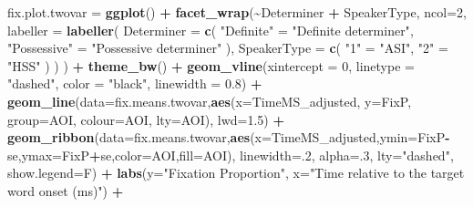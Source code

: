 \documentclass[
]{article}
\newenvironment{Shaded}{\begin{snugshade}}{\end{snugshade}}
\newcommand{\AttributeTok}[1]{\textcolor[rgb]{0.13,0.29,0.53}{#1}}
\newcommand{\DecValTok}[1]{\textcolor[rgb]{0.00,0.00,0.81}{#1}}
\newcommand{\FloatTok}[1]{\textcolor[rgb]{0.00,0.00,0.81}{#1}}
\newcommand{\FunctionTok}[1]{\textcolor[rgb]{0.13,0.29,0.53}{\textbf{#1}}}
\newcommand{\NormalTok}[1]{#1}
\newcommand{\OtherTok}[1]{\textcolor[rgb]{0.56,0.35,0.01}{#1}}
\newcommand{\SpecialCharTok}[1]{\textcolor[rgb]{0.81,0.36,0.00}{\textbf{#1}}}
\newcommand{\StringTok}[1]{\textcolor[rgb]{0.31,0.60,0.02}{#1}}
\begin{document}
\begin{Shaded}
\begin{Highlighting}[]
\NormalTok{fix.plot.twovar }\OtherTok{=} \FunctionTok{ggplot}\NormalTok{() }\SpecialCharTok{+} 
  \FunctionTok{facet\_wrap}\NormalTok{(}\SpecialCharTok{\textasciitilde{}}\NormalTok{Determiner }\SpecialCharTok{+}\NormalTok{ SpeakerType, }\AttributeTok{ncol=}\DecValTok{2}\NormalTok{,}
             \AttributeTok{labeller =} \FunctionTok{labeller}\NormalTok{(}
              \AttributeTok{Determiner =} \FunctionTok{c}\NormalTok{(}
                \StringTok{"Definite"} \OtherTok{=} \StringTok{"Definite determiner"}\NormalTok{,}
                \StringTok{"Possessive"} \OtherTok{=} \StringTok{"Possessive determiner"}
\NormalTok{              ),}
              \AttributeTok{SpeakerType =} \FunctionTok{c}\NormalTok{(}
                \StringTok{"1"} \OtherTok{=} \StringTok{"ASI"}\NormalTok{,}
                \StringTok{"2"} \OtherTok{=} \StringTok{"HSS"}
\NormalTok{              )}
\NormalTok{            )}
\NormalTok{             ) }\SpecialCharTok{+} \FunctionTok{theme\_bw}\NormalTok{() }\SpecialCharTok{+} 
  \FunctionTok{geom\_vline}\NormalTok{(}\AttributeTok{xintercept =} \DecValTok{0}\NormalTok{, }\AttributeTok{linetype =} \StringTok{"dashed"}\NormalTok{, }\AttributeTok{color =} \StringTok{"black"}\NormalTok{, }\AttributeTok{linewidth =} \FloatTok{0.8}\NormalTok{) }\SpecialCharTok{+}
  \FunctionTok{geom\_line}\NormalTok{(}\AttributeTok{data=}\NormalTok{fix.means.twovar,}\FunctionTok{aes}\NormalTok{(}\AttributeTok{x=}\NormalTok{TimeMS\_adjusted, }\AttributeTok{y=}\NormalTok{FixP, }\AttributeTok{group=}\NormalTok{AOI, }\AttributeTok{colour=}\NormalTok{AOI, }\AttributeTok{lty=}\NormalTok{AOI), }\AttributeTok{lwd=}\FloatTok{1.5}\NormalTok{) }\SpecialCharTok{+}
  \FunctionTok{geom\_ribbon}\NormalTok{(}\AttributeTok{data=}\NormalTok{fix.means.twovar,}\FunctionTok{aes}\NormalTok{(}\AttributeTok{x=}\NormalTok{TimeMS\_adjusted,}\AttributeTok{ymin=}\NormalTok{FixP}\SpecialCharTok{{-}}\NormalTok{se,}\AttributeTok{ymax=}\NormalTok{FixP}\SpecialCharTok{+}\NormalTok{se,}\AttributeTok{color=}\NormalTok{AOI,}\AttributeTok{fill=}\NormalTok{AOI), }\AttributeTok{linewidth=}\NormalTok{.}\DecValTok{2}\NormalTok{, }\AttributeTok{alpha=}\NormalTok{.}\DecValTok{3}\NormalTok{, }\AttributeTok{lty=}\StringTok{"dashed"}\NormalTok{, }\AttributeTok{show.legend=}\NormalTok{F)  }\SpecialCharTok{+}
  \FunctionTok{labs}\NormalTok{(}\AttributeTok{y=}\StringTok{"Fixation Proportion"}\NormalTok{, }\AttributeTok{x=}\StringTok{"Time relative to the target word onset (ms)"}\NormalTok{) }\SpecialCharTok{+} 
  

\end{Highlighting}
\end{Shaded}
\end{document}
